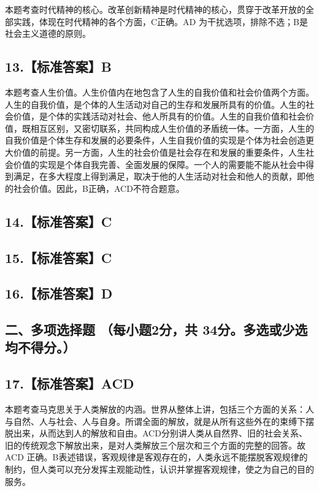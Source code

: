 \documentclass[UTF8,11pt]{ctexart}
\begin{document}
本题考查时代精神的核心。改革创新精神是时代精神的核心，贯穿于改革开放的全部实践，体现在时代精神的各个方面，C正确。AD 为干扰选项，排除不选；B是社会主义道德的原则。


\subsection*{13.【标准答案】B}

本题考查人生价值。人生价值内在地包含了人生的自我价值和社会价值两个方面。人生的自我价值，是个体的人生活动对自己的生存和发展所具有的价值。人生的社会价值，是个体的实践活动对社会、他人所具有的价值。人生的自我价值和社会价值，既相互区别，又密切联系，共同构成人生价值的矛盾统一体。一方面，人生的自我价值是个体生存和发展的必要条件，人生自我价值的实现是个体为社会创造更大价值的前提。另一方面，人生的社会价值是社会存在和发展的重要条件，人生社会价值的实现是个体自我完善、全面发展的保障。一个人的需要能不能从社会中得到满足，在多大程度上得到满足，取决于他的人生活动对社会和他人的贡献，即他的社会价值。因此，B正确，ACD不符合题意。


\subsection*{14.【标准答案】C}

\subsection*{15.【标准答案】C}

\subsection*{16.【标准答案】D}

\subsection*{二、多项选择题 （每小题2分，共 34分。多选或少选均不得分。）}

\subsection*{17.【标准答案】ACD}

本题考查马克思关于人类解放的内涵。世界从整体上讲，包括三个方面的关系：人与自然、人与社会、人与自身。所谓全面的解放，就是从所有这些外在的束缚下摆脱出来，从而达到人的解放和自由。ACD分别讲人类从自然界、旧的社会关系、旧的传统观念下解放出来，是对人类解放三个层次和三个方面的完整的回答。故 ACD 正确。B表述错误，客观规律是客观存在的，人类永远不能摆脱客观规律的制约，但人类可以充分发挥主观能动性，认识并掌握客观规律，使之为自己的目的服务。
\end{document}
